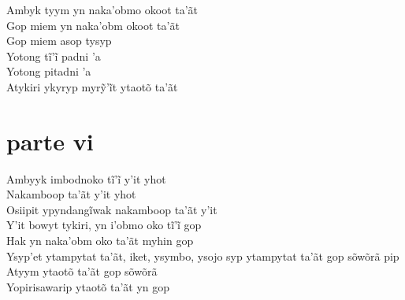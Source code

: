  \smallskip
 \begin{center}\end{center}
 \smallskip
 
\noindent   Ambyk tyym yn naka'obmo okoot ta'ãt\\
  Gop miem yn naka'obm okoot ta'ãt\\
  Gop miem asop tysyp\\
  Yotong tĩ’ĩ padni ’a\\
  Yotong pitadni 'a\\
  Atykiri ykyryp myrỹ’ĩt ytaotõ ta’ãt
 
 
 \medskip
\section{parte vi}

  \noindent Ambyyk imbodnoko tĩ’ĩ y’it yhot\\
  Nakamboop ta'ãt y'it yhot\\
  Osiipit ypyndangĩwak nakamboop ta’ãt y’it\\
  Y’it bowyt tykiri, yn i’obmo oko tĩ’ĩ gop\\
  Hak yn naka'obm oko ta'ãt myhin gop\\
  Ysyp'et ytampytat ta'ãt, iket, ysymbo, ysojo syp ytampytat ta'ãt gop sõwõrã pip\\
  Atyym ytaotõ ta'ãt gop sõwõrã\\
  Yopirisawarip ytaotõ ta'ãt yn gop
 
